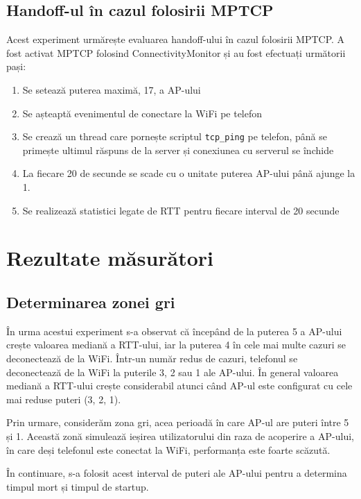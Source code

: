 \subsection{Handoff-ul în cazul folosirii MPTCP}

Acest experiment urmărește evaluarea handoff-ului în cazul folosirii MPTCP. A fost activat MPTCP folosind ConnectivityMonitor și au fost efectuați următorii pași:
\begin{enumerate}
	\item Se setează puterea maximă, 17,  a AP-ului
	\item Se așteaptă evenimentul de conectare la WiFi pe telefon
	\item Se crează un thread care pornește scriptul \texttt{tcp\_ping} pe telefon, până se primește ultimul răspuns de la server și conexiunea cu serverul se închide
	\item La fiecare 20 de secunde se scade cu o unitate puterea AP-ului până ajunge la 1.
	\item Se realizează statistici legate de RTT pentru fiecare interval de 20 secunde
\end{enumerate}



\section{Rezultate măsurători}

\subsection{Determinarea zonei gri}

În urma acestui experiment s-a observat că începând de la puterea 5 a AP-ului crește valoarea mediană a RTT-ului, iar la puterea 4 în cele mai multe cazuri se deconectează de la WiFi. Într-un număr redus de cazuri, telefonul se deconectează de la WiFi la puterile 3, 2 sau 1 ale AP-ului. În general valoarea mediană a RTT-ului crește considerabil atunci când AP-ul este configurat cu cele mai reduse puteri (3, 2, 1).

Prin urmare, considerăm zona gri, acea perioadă în care AP-ul are puteri între 5 și 1. Această zonă simulează ieșirea utilizatorului din raza de acoperire a AP-ului, în care deși telefonul este conectat la WiFi, performanța este foarte scăzută. 

În continuare, s-a folosit acest interval de puteri ale AP-ului pentru a determina timpul mort și timpul de startup.

